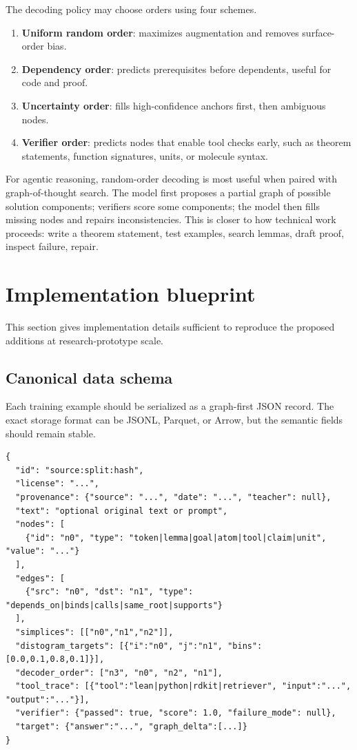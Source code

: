 \documentclass[11pt]{article}
\newcommand{\1}{\mathbf{1}}
\begin{document}
The decoding policy may choose orders using four schemes.

\begin{enumerate}
\item \textbf{Uniform random order}: maximizes augmentation and removes surface-order bias.
\item \textbf{Dependency order}: predicts prerequisites before dependents, useful for code and proof.
\item \textbf{Uncertainty order}: fills high-confidence anchors first, then ambiguous nodes.
\item \textbf{Verifier order}: predicts nodes that enable tool checks early, such as theorem statements, function signatures, units, or molecule syntax.
\end{enumerate}

For agentic reasoning, random-order decoding is most useful when paired with graph-of-thought search. The model first proposes a partial graph of possible solution components; verifiers score some components; the model then fills missing nodes and repairs inconsistencies. This is closer to how technical work proceeds: write a theorem statement, test examples, search lemmas, draft proof, inspect failure, repair.

\section{Implementation blueprint}
\label{sec:implementation-blueprint}

This section gives implementation details sufficient to reproduce the proposed additions at research-prototype scale.

\subsection{Canonical data schema}

Each training example should be serialized as a graph-first JSON record. The exact storage format can be JSONL, Parquet, or Arrow, but the semantic fields should remain stable.

\begin{lstlisting}[caption={Minimal graph-first training record.}]
{
  "id": "source:split:hash",
  "license": "...",
  "provenance": {"source": "...", "date": "...", "teacher": null},
  "text": "optional original text or prompt",
  "nodes": [
    {"id": "n0", "type": "token|lemma|goal|atom|tool|claim|unit", "value": "..."}
  ],
  "edges": [
    {"src": "n0", "dst": "n1", "type": "depends_on|binds|calls|same_root|supports"}
  ],
  "simplices": [["n0","n1","n2"]],
  "distogram_targets": [{"i":"n0", "j":"n1", "bins":[0.0,0.1,0.8,0.1]}],
  "decoder_order": ["n3", "n0", "n2", "n1"],
  "tool_trace": [{"tool":"lean|python|rdkit|retriever", "input":"...", "output":"..."}],
  "verifier": {"passed": true, "score": 1.0, "failure_mode": null},
  "target": {"answer":"...", "graph_delta":[...]}
}
\end{lstlisting}
\end{document}
